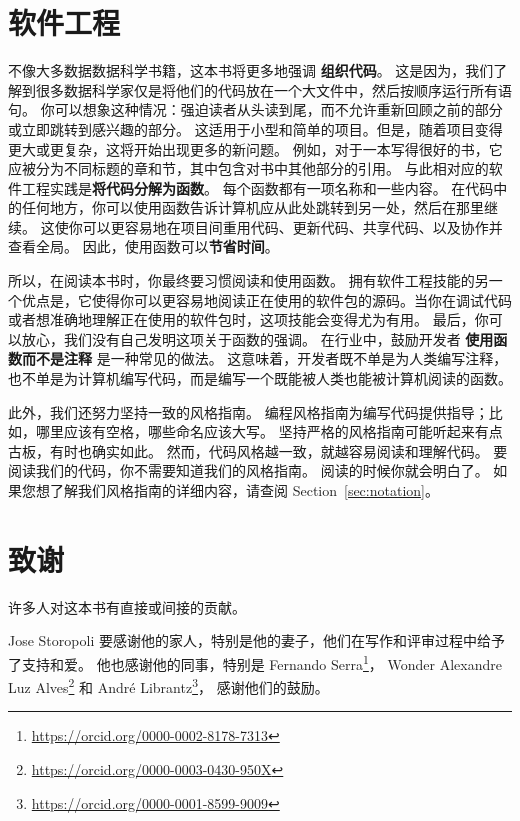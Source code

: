 \documentclass[
  notoc %
]{tufte-book}
\DeclareRobustCommand{\href}[2]{#2\footnote{\url{#1}}}
\begin{document}
\hypertarget{sec:engineering}{%
\section{软件工程}\label{sec:engineering}}

不像大多数据数据科学书籍，这本书将更多地强调 \textbf{组织代码}。
这是因为，我们了解到很多数据科学家仅是将他们的代码放在一个大文件中，然后按顺序运行所有语句。
你可以想象这种情况：强迫读者从头读到尾，而不允许重新回顾之前的部分或立即跳转到感兴趣的部分。
这适用于小型和简单的项目。但是，随着项目变得更大或更复杂，这将开始出现更多的新问题。
例如，对于一本写得很好的书，它应被分为不同标题的章和节，其中包含对书中其他部分的引用。
与此相对应的软件工程实践是\textbf{将代码分解为函数}。
每个函数都有一项名称和一些内容。
在代码中的任何地方，你可以使用函数告诉计算机应从此处跳转到另一处，然后在那里继续。
这使你可以更容易地在项目间重用代码、更新代码、共享代码、以及协作并查看全局。
因此，使用函数可以\textbf{节省时间}。

所以，在阅读本书时，你最终要习惯阅读和使用函数。
拥有软件工程技能的另一个优点是，它使得你可以更容易地阅读正在使用的软件包的源码。当你在调试代码或者想准确地理解正在使用的软件包时，这项技能会变得尤为有用。
最后，你可以放心，我们没有自己发明这项关于函数的强调。
在行业中，鼓励开发者 \textbf{使用函数而不是注释} 是一种常见的做法。
这意味着，开发者既不单是为人类编写注释，也不单是为计算机编写代码，而是编写一个既能被人类也能被计算机阅读的函数。

此外，我们还努力坚持一致的风格指南。
编程风格指南为编写代码提供指导；比如，哪里应该有空格，哪些命名应该大写。
坚持严格的风格指南可能听起来有点古板，有时也确实如此。
然而，代码风格越一致，就越容易阅读和理解代码。
要阅读我们的代码，你不需要知道我们的风格指南。 阅读的时候你就会明白了。
如果您想了解我们风格指南的详细内容，请查阅 Section~\ref{sec:notation}。

\hypertarget{sec:acknowledgements}{%
\section{致谢}\label{sec:acknowledgements}}

许多人对这本书有直接或间接的贡献。

Jose Storopoli
要感谢他的家人，特别是他的妻子，他们在写作和评审过程中给予了支持和爱。
他也感谢他的同事，特别是
\href{https://orcid.org/0000-0002-8178-7313}{Fernando Serra}，
\href{https://orcid.org/0000-0003-0430-950X}{Wonder Alexandre Luz Alves}
和 \href{https://orcid.org/0000-0001-8599-9009}{André Librantz}，
感谢他们的鼓励。
\end{document}
